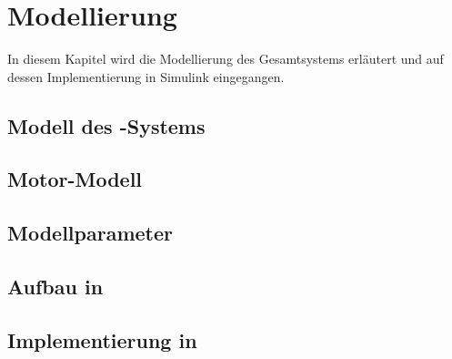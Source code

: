 \chapter{Modellierung}\label{cha:modell}

In diesem Kapitel wird die Modellierung des Gesamtsystems erläutert und auf dessen Implementierung in Simulink eingegangen.


\section{Modell des \spd-Systems}



\section{Motor-Modell}



\section{Modellparameter}\label{sec:mparams}



\section{Aufbau in \Simulink}



\section{Implementierung in \Matlab}
